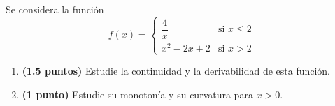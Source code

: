 
Se considera la función
\[
f(x)=\begin{cases}
\dfrac{4}{x} & \text{si }x\leq 2\\[4pt]
x^2-2x+2 & \text{si }x>2
\end{cases}
\]
\begin{enumerate}[label=\alph*)]
\item \textbf{(1.5 puntos)} Estudie la continuidad y la derivabilidad de esta función.
\item \textbf{(1 punto)} Estudie su monotonía y su curvatura para $x>0$.
\end{enumerate}
